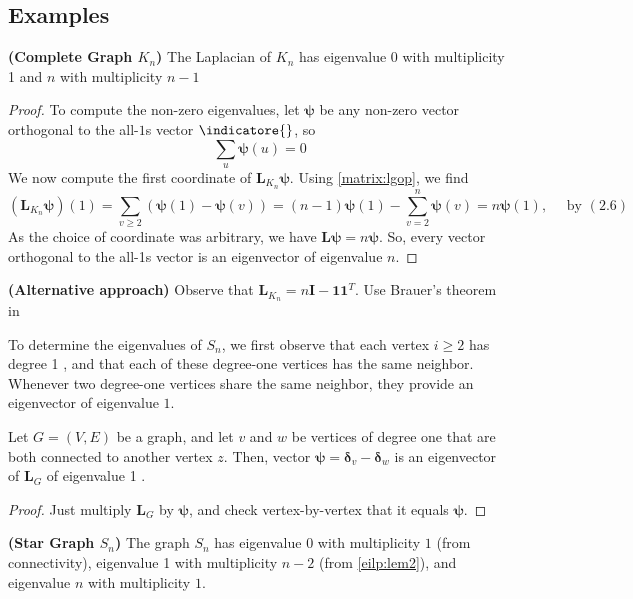 \documentclass{article}
\newcommand{\bsl}[1]{\boldsymbol{#1}}
\newcommand{\bfs}[1]{\textbf{({#1}) }}
\begin{document}
\subsection{Examples}

\begin{lema}{\bfs{Complete Graph $K_n$}}
The Laplacian of $K_{n}$ has eigenvalue 0 with multiplicity 1 and $n$ with multiplicity $n-1$
\end{lema}
\begin{proof}
To compute the non-zero eigenvalues, let $\bsl{\psi}$ be any non-zero vector orthogonal to the all-$1$s vector $\indicatore{}$, so
$$
\sum_{u} \bsl{\psi}(u)=0
$$
We now compute the first coordinate of $\boldsymbol{L}_{K_{n}} \boldsymbol{\psi} .$ Using \cref{matrix:lgop}, we find
$$
\left(\boldsymbol{L}_{K_{n}} \boldsymbol{\psi}\right)(1)=\sum_{v \geq 2}(\boldsymbol{\psi}(1)-\boldsymbol{\psi}(v))=(n-1) \boldsymbol{\psi}(1)-\sum_{v=2}^{n} \boldsymbol{\psi}(v)=n \boldsymbol{\psi}(1), \quad \text { by }(2.6)
$$
As the choice of coordinate was arbitrary, we have $\boldsymbol{L} \boldsymbol{\psi}=n \boldsymbol{\psi}$. So, every vector orthogonal to the all-1s vector is an eigenvector of eigenvalue $n$.
\end{proof}
\begin{rema}{\bfs{Alternative approach}}
Observe that $\boldsymbol{L}_{K_{n}}=n \boldsymbol{I}-\mathbf{1 1}^{T}$. Use Brauer’s theorem in \cite[Page51]{horn2012matrix}
\end{rema}

To determine the eigenvalues of $S_{n}$, we first observe that each vertex $i \geq 2$ has degree 1 , and that each of these degree-one vertices has the same neighbor. Whenever two degree-one vertices share the same neighbor, they provide an eigenvector of eigenvalue $1 .$
\begin{lema}\label{eilp:lem2}
Let $G=(V, E)$ be a graph, and let $v$ and $w$ be vertices of degree one that are both connected to another vertex $z .$ Then, vector $\boldsymbol{\psi}=\boldsymbol{\delta}_{v}-\boldsymbol{\delta}_{w}$ is an eigenvector of $\boldsymbol{L}_{G}$ of eigenvalue 1 .
\end{lema}

\begin{proof}
Just multiply $\boldsymbol{L}_{G}$ by $\boldsymbol{\psi}$, and check vertex-by-vertex that it equals $\boldsymbol{\psi} .$
\end{proof}

\begin{lema}{\bfs{Star Graph $S_n$}}
The graph $S_{n}$ has eigenvalue $0$ with multiplicity $1$ (from connectivity), eigenvalue 1 with multiplicity $n-2$ (from \cref{eilp:lem2}), and eigenvalue $n$ with multiplicity $1 .$
\end{lema} 
\end{document}

